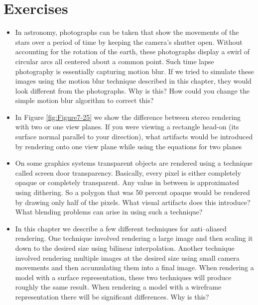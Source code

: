 \printbibliography


\section{Exercises}

\begin{itemize}

\item In astronomy, photographs can be taken that show the movements of the stars over a period of time by keeping the camera's shutter open. Without accounting for the rotation of the earth, these photographs display a swirl of circular arcs all centered about a common point. Such time lapse photography is essentially capturing motion blur. If we tried to simulate these images using the motion blur technique described in this chapter, they would look different from the photographs. Why is this? How could you change the simple motion blur algorithm to correct this?

\item In Figure \ref{fig:Figure7-25} we show the difference between stereo rendering with two or one view planes. If you were viewing a rectangle head-on (its surface normal parallel to your direction), what artifacts would be introduced by rendering onto one view plane while using the equations for two planes

\item On some graphics systems transparent objects are rendered using a technique called screen door transparency. Basically, every pixel is either completely opaque or completely transparent. Any value in between is approximated using dithering. So a polygon that was 50 percent opaque would be rendered by drawing only half of the pixels. What visual artifacts does this introduce? What blending problems can arise in using such a technique?

\item In this chapter we describe a few different techniques for anti--aliased rendering. One technique involved rendering a large image and then scaling it down to the desired size using bilinear interpolation. Another technique involved rendering multiple images at the desired size using small camera movements and then accumulating them into a final image. When rendering a model with a surface representation, these two techniques will produce roughly the same result. When rendering a model with a wireframe representation there will be significant differences. Why is this?


\end{itemize}
